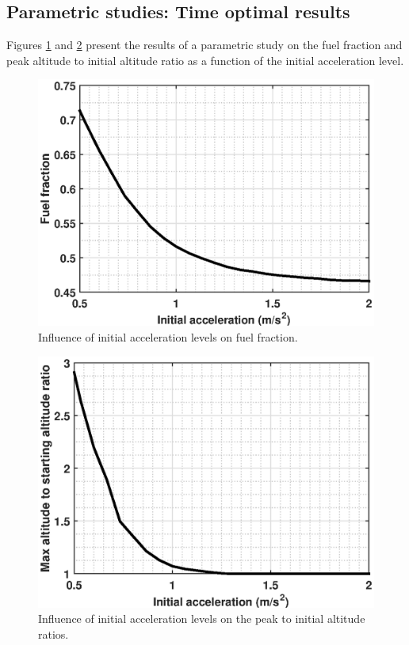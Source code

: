 \subsection{Parametric studies: Time optimal results}
Figures \ref{fig:parametric:1} and \ref{fig:parametric:2} present the results of a parametric study on the fuel fraction and peak altitude to initial altitude ratio as a function of the initial acceleration level.
\begin{figure}[H]
	\centering\includegraphics[width=0.90\linewidth]{fuelvsaccl.eps}
	\caption{Influence of initial acceleration levels on fuel fraction.\label{fig:parametric:1}}
\end{figure}
\begin{figure}[H]
	\centering\includegraphics[width=0.90\linewidth]{altvsaccl.eps}
	\caption{Influence of initial acceleration levels on the peak to initial altitude ratios.\label{fig:parametric:2}}
\end{figure}
